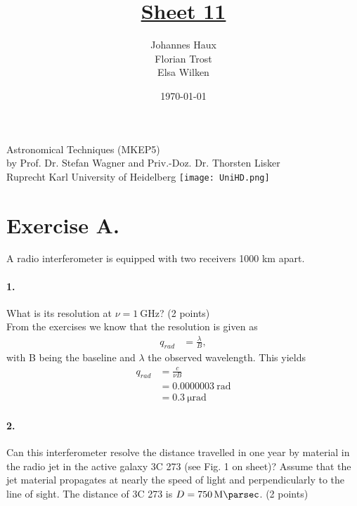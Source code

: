 \documentclass[11pt,a4paper,twoside]{article}
\title{\LARGE \underline {Sheet 11}}
\author{Johannes Haux \\ Florian Trost \\ Elsa Wilken}
\date{\today}
\begin{document}
\maketitle
\thispagestyle{empty}

\begin{center}
  Astronomical Techniques (MKEP5) \\
  \baselineskip35pt
  by Prof. Dr. Stefan Wagner and Priv.-Doz. Dr. Thorsten Lisker \\
  \baselineskip60pt
  Ruprecht Karl University of Heidelberg
\vskip 40pt
\texttt{[image: UniHD.png]}

\end{center}

\newpage
\setcounter{page}{1}		%

\section*{Exercise A.}

A radio interferometer is equipped with two receivers 1000 km apart. \\

\paragraph{1.} What is its resolution at $\nu = \SI{1}{\giga\hertz}$? (2
points) \\

From the exercises we know that the resolution is given as
\begin{align}
    q_{rad} &= \frac{\lambda}{B},
\end{align}
with B being the baseline and $\lambda$ the observed wavelength. This yields
\begin{align}
    q_{rad} &= \frac{c}{\nu B} \\
            &= \SI{0.0000003}{\radian} \\
            &= \SI{0.3}{\micro\radian}
\end{align}

\paragraph{2.} Can this interferometer resolve the distance travelled in one
year by material in the radio jet in the active galaxy 3C 273 (see Fig. 1 on
sheet)? Assume that the jet material propagates at nearly the speed of light
and perpendicularly to the line of sight. The distance of 3C 273 is
$D = \SI{750}{\mega\parsec}$. (2 points) \\
\end{document}
